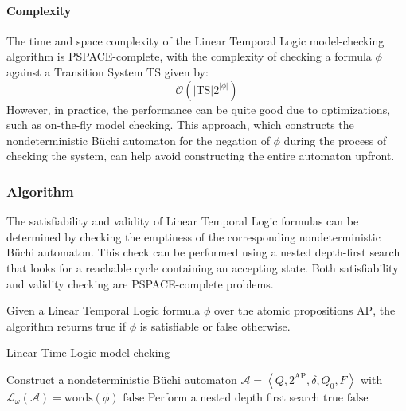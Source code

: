 \paragraph*{Complexity}
The time and space complexity of the Linear Temporal Logic model-checking algorithm is PSPACE-complete, with the complexity of checking a formula $\phi$ against a Transition System $\text{TS}$ given by:
\[\mathcal{O}(\left\lvert \text{TS}\right\rvert 2^{\left\lvert \phi\right\rvert })\]
\noindent However, in practice, the performance can be quite good due to optimizations, such as on-the-fly model checking. 
This approach, which constructs the nondeterministic Büchi automaton for the negation of $\phi$ during the process of checking the system, can help avoid constructing the entire automaton upfront.

\subsubsection{Algorithm}
The satisfiability and validity of Linear Temporal Logic formulas can be determined by checking the emptiness of the corresponding nondeterministic Büchi automaton. 
This check can be performed using a nested depth-first search that looks for a reachable cycle containing an accepting state. 
Both satisfiability and validity checking are PSPACE-complete problems.

Given a Linear Temporal Logic formula $\phi$ over the atomic propositions $\text{AP}$, the algorithm returns true if $\phi$ is satisfiable or false otherwise.
\begin{algorithm}[H]
    \caption{Linear Time Logic model cheking}
        \begin{algorithmic}[1]
            \State Construct a nondeterministic Büchi automaton $\mathcal{A}=\left\langle Q,2^{\text{AP}},\delta,Q_0,F\right\rangle$ with $\mathcal{L}_{\omega}(\mathcal{A})=\text{words}(\phi)$
                \State \Return $\text{false}$
            \EndIf
            \Repeat
                \State Perform a nested depth first search
                    \State \Return $\text{true}$
                \EndIf 
            \State \Return $\text{false}$
        \end{algorithmic}
\end{algorithm}
